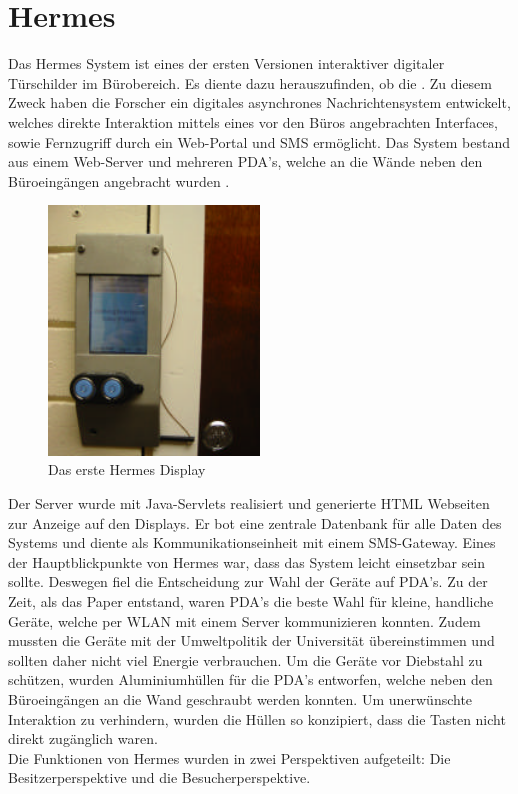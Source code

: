 \section{Hermes}
Das Hermes System \cite{cheverest:2003:paper,cheverest:2003:article,cheverest:2003:hermes,cheveres:2005:hermes-bluetooth} ist eines der ersten Versionen interaktiver digitaler Türschilder im Bürobereich.
Es diente dazu herauszufinden, ob die .
Zu diesem Zweck haben die Forscher ein digitales asynchrones Nachrichtensystem entwickelt, welches direkte Interaktion mittels eines vor den Büros angebrachten Interfaces, sowie Fernzugriff durch ein Web-Portal und SMS ermöglicht.
Das System bestand aus einem Web-Server und mehreren PDA's, welche an die Wände neben den Büroeingängen angebracht wurden .
\begin{figure}[h!]
  \centering
  \includegraphics[width=0.5\textwidth]{./img/hermes_display.png}
  \caption{Das erste Hermes Display \cite{cheverest:2003:paper}}
  \label{img:hermesDisplay}
\end{figure}
Der Server wurde mit Java-Servlets realisiert und generierte HTML Webseiten zur Anzeige auf den Displays. Er bot eine zentrale Datenbank für alle Daten des Systems und diente als Kommunikationseinheit mit einem SMS-Gateway.
Eines der Hauptblickpunkte von Hermes war, dass das System leicht einsetzbar sein sollte. Deswegen fiel die Entscheidung zur Wahl der Geräte auf PDA's. Zu der Zeit, als das Paper entstand, waren PDA's die beste Wahl für kleine, handliche Geräte, welche per WLAN mit einem Server kommunizieren konnten. Zudem mussten die Geräte mit der Umweltpolitik der Universität übereinstimmen und sollten daher nicht viel Energie verbrauchen.
Um die Geräte vor Diebstahl zu schützen, wurden Aluminiumhüllen für die PDA's entworfen, welche neben den Büroeingängen an die Wand geschraubt werden konnten. Um unerwünschte Interaktion zu verhindern, wurden die Hüllen so konzipiert, dass die Tasten nicht direkt zugänglich waren.
\\
Die Funktionen von Hermes wurden in zwei Perspektiven aufgeteilt: Die Besitzerperspektive und die Besucherperspektive.
